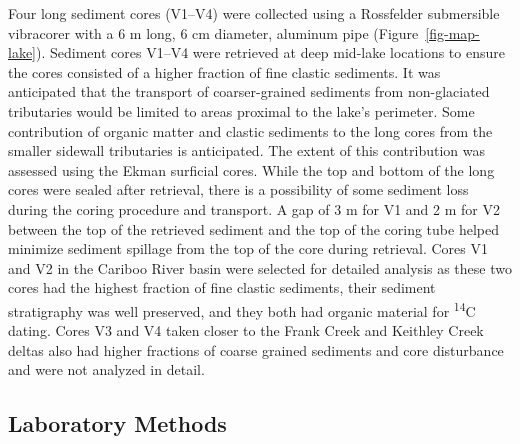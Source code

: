 \documentclass[
  letterpaper,
  DIV=11,
  numbers=noendperiod]{scrartcl}
\begin{document}
Four long sediment cores (V1--V4) were collected using a Rossfelder
submersible vibracorer with a 6 m long, 6 cm diameter, aluminum pipe
(Figure~\ref{fig-map-lake}). Sediment cores V1--V4 were retrieved at
deep mid-lake locations to ensure the cores consisted of a higher
fraction of fine clastic sediments. It was anticipated that the
transport of coarser-grained sediments from non-glaciated tributaries
would be limited to areas proximal to the lake's perimeter. Some
contribution of organic matter and clastic sediments to the long cores
from the smaller sidewall tributaries is anticipated. The extent of this
contribution was assessed using the Ekman surficial cores. While the top
and bottom of the long cores were sealed after retrieval, there is a
possibility of some sediment loss during the coring procedure and
transport. A gap of 3 m for V1 and 2 m for V2 between the top of the
retrieved sediment and the top of the coring tube helped minimize
sediment spillage from the top of the core during retrieval. Cores V1
and V2 in the Cariboo River basin were selected for detailed analysis as
these two cores had the highest fraction of fine clastic sediments,
their sediment stratigraphy was well preserved, and they both had
organic material for \textsuperscript{14}C dating. Cores V3 and V4 taken
closer to the Frank Creek and Keithley Creek deltas also had higher
fractions of coarse grained sediments and core disturbance and were not
analyzed in detail.

\subsection{Laboratory Methods}\label{laboratory-methods}
\end{document}

